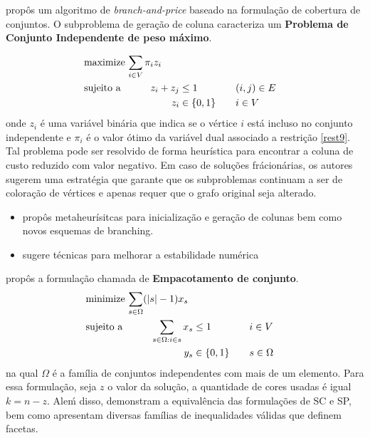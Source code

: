 \documentclass[11pt]{article}
\begin{document}
\textcite{Mehrotra1996ColumnGenerationApproach} propôs um algoritmo de \emph{branch-and-price}  baseado na formulação de cobertura de conjuntos.
O subproblema de geração de coluna caracteriza um \textbf{Problema de Conjunto Independente de peso máximo}.

\begin{alignat*}{4}
& \omit\rlap{maximize  $\displaystyle \sum_{i \in V} \pi_i z_i$} \\
& \mbox{sujeito a}&& \quad & z_i + z_j &\leq 1 & \quad & (i,j) \in E \\
&                 &&   & z_i       & \in \{0,1\} &    & i \in V
\end{alignat*}
onde \(z_i\) é uma variável binária que indica se o vértice \(i\) está incluso no conjunto independente e \(\pi_i\) é o valor ótimo da variável dual associado a restrição \ref{rest9}.
Tal problema pode ser resolvido de forma heurística para encontrar a coluna de custo reduzido com valor negativo.
Em caso de soluções frácionárias, os autores sugerem uma estratégia  que garante que os subproblemas continuam a ser de coloração de vértices e apenas requer que o grafo original seja alterado.

\begin{itemize}
\item \textcite{Malaguti2011ExactApproachVertex} propôs metaheurísitcas para inicialização e geração de colunas bem como novos esquemas de branching.
\item \textcite{Held2012Maximumweightstable} sugere técnicas para melhorar a estabilidade numérica
\end{itemize}

\textcite{Hansen2009Setcoveringpacking} propôs a formulação chamada de \textbf{Empacotamento de conjunto}.
\begin{alignat*}{4}
& \omit\rlap{minimize  $\displaystyle \sum_{s \in \Omega} (|s| - 1)x_s$} \\
& \mbox{sujeito a}&& \quad & \sum_{s \in \Omega: i \in s} x_{s}&\leq 1 & \quad & i \in V \\
&                 &&   & y_s       & \in \{0,1\} &    & s \in \Omega
\end{alignat*}
na qual \(\Omega\) é a família de conjuntos independentes com mais de um elemento.
Para essa formulação, seja \(z\) o valor da solução, a quantidade de cores usadas é igual \(k = n - z\).
Aleḿ disso, \textcite{Hansen2009Setcoveringpacking} demonstram a equivalência das formulações de SC e SP, bem como apresentam diversas famílias de inequalidades válidas que definem facetas.
\end{document}
